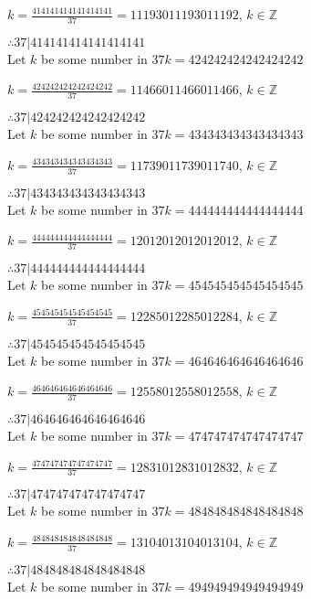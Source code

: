 \documentclass{article}
\begin{document}
$k = \frac{414141414141414141}{37} = 11193011193011192$, $k \in \mathbb{Z}$

$ \therefore  37|414141414141414141 $ \\

Let $k$ be some number in $37k = 424242424242424242$

$k = \frac{424242424242424242}{37} = 11466011466011466$, $k \in \mathbb{Z}$

$ \therefore  37|424242424242424242 $ \\

Let $k$ be some number in $37k = 434343434343434343$

$k = \frac{434343434343434343}{37} = 11739011739011740$, $k \in \mathbb{Z}$

$ \therefore  37|434343434343434343 $ \\

Let $k$ be some number in $37k = 444444444444444444$

$k = \frac{444444444444444444}{37} = 12012012012012012$, $k \in \mathbb{Z}$

$ \therefore  37|444444444444444444 $ \\

Let $k$ be some number in $37k = 454545454545454545$

$k = \frac{454545454545454545}{37} = 12285012285012284$, $k \in \mathbb{Z}$

$ \therefore  37|454545454545454545 $ \\

Let $k$ be some number in $37k = 464646464646464646$

$k = \frac{464646464646464646}{37} = 12558012558012558$, $k \in \mathbb{Z}$

$ \therefore  37|464646464646464646 $ \\

Let $k$ be some number in $37k = 474747474747474747$

$k = \frac{474747474747474747}{37} = 12831012831012832$, $k \in \mathbb{Z}$

$ \therefore  37|474747474747474747 $ \\

Let $k$ be some number in $37k = 484848484848484848$

$k = \frac{484848484848484848}{37} = 13104013104013104$, $k \in \mathbb{Z}$

$ \therefore  37|484848484848484848 $ \\

Let $k$ be some number in $37k = 494949494949494949$
\end{document}
